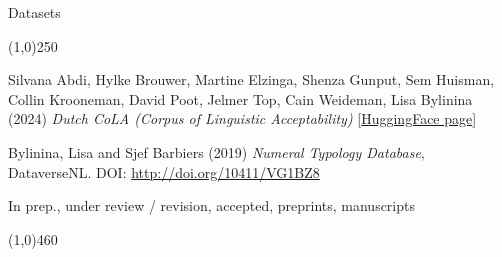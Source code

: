 \documentclass[12pt,letterpaper]{article}
\begin{document}
\vspace{5mm}

\pagebreak
\noindent \Large{Datasets}

\vspace{-4mm}
\noindent\line(1,0){250}

\small{
\begin{hangparas}{.25in}{1} 

Silvana Abdi, Hylke Brouwer, Martine Elzinga, Shenza Gunput, Sem Huisman, Collin Krooneman, David Poot, Jelmer Top, Cain Weideman, Lisa Bylinina (2024) {\it Dutch CoLA (Corpus of Linguistic Acceptability)} [\href{https://huggingface.co/datasets/GroNLP/dutch-cola}{HuggingFace page}]

\vspace{1mm}

\end{hangparas}
}

\small{
\begin{hangparas}{.25in}{1} 

Bylinina, Lisa and Sjef Barbiers (2019) {\it Numeral Typology Database}, DataverseNL. DOI: \url{http://doi.org/10411/VG1BZ8}

\vspace{1mm}

\end{hangparas}
}

\vspace{5mm}

\noindent \Large{In prep., under review / revision, accepted, preprints, manuscripts}

\vspace{-4mm}
\noindent\line(1,0){460}
\end{document}
